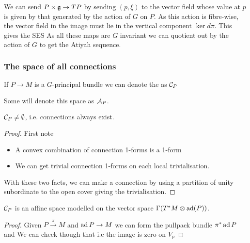 \documentclass{article}
\begin{document}
\begin{remark}
	We can send $P \times \mathfrak{g} \to TP$ by sending $(p,\xi)$ to the vector field whose value at $p$ is given by that generated by the action of $G$ on $P$. As this action is fibre-wise, the vector field in the image must lie in the vertical component $\ker d\pi$. This gives the SES 
As all these maps are $G$ invariant we can quotient out by the action of $G$ to get the Atiyah sequence. 
\end{remark}

\subsubsection{The space of all connections}

\begin{definition}
If $P \to M$ is a $G$-principal bundle we can denote the  as $\mathcal{C}_P$
\end{definition} 

\begin{remark}
	Some will denote this space as $\mathcal{A}_P$. 
\end{remark}

\begin{prop}
	$\mathcal{C}_P \neq \emptyset$, i.e. connections always exist. 
\end{prop}
\begin{proof}
	First note 
	\begin{itemize}
		\item A convex combination of connection 1-forms is a 1-form
		\item We can get trivial connection 1-forms on each local trivialisation. 
	\end{itemize}
	With these two facts, we can make a connection by using a partition of unity subordinate to the open cover giving the trivialisation. 
\end{proof}

\begin{prop}
	$\mathcal{C}_P$ is an affine space modelled on the vector space $\Gamma(T^\ast M \otimes \operatorname{ad}(P))$. 
\end{prop}
\begin{proof}
	Given $P\overset{\pi}{\to} M$ and $\operatorname{ad} P \to M$ we can form the pullpack bundle $\pi^\ast \operatorname{ad} P$ and 
We can check though that 
i.e the image is zero on $V_p$
\end{proof}
\end{document}
